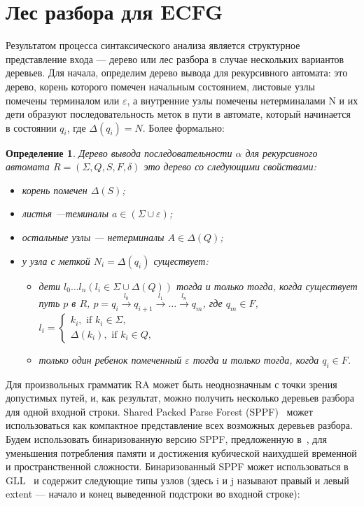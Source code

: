 \documentclass[14pt]{matmex-diploma-custom}
\newtheorem{mydef}{Определение}
\begin{document}
	\section{Лес разбора для ECFG}
	Результатом процесса синтаксического анализа является структурное представление 
	входа --- дерево или лес разбора в случае нескольких вариантов деревьев.
	Для начала, определим дерево вывода для рекурсивного автомата: 
	это дерево, корень которого помечен начальным состоянием, листовые узлы помечены
	терминалом или $\varepsilon$, а внутренние узлы помечены нетерминалами N и их
	дети образуют последовательность меток в пути в автомате, который начинается в 
	состоянии $q_i$, где $ \Delta(q_i) = N $. Более формально:
	
	\begin{mydef}
		
		Дерево вывода последовательности $\alpha$ для рекурсивного автомата $R=(\Sigma, Q, S, F, \delta)$ это дерево со следующими свойствами:
		
		\begin{itemize}
			\item корень помечен $\Delta(S)$;
			\item листья ---теминалы $a\in (\Sigma \cup \varepsilon)$;
			\item остальные узлы --- нетерминалы $A\in \Delta(Q)$;
			\item у узла с меткой $N_i = \Delta(q_i)$ существует:
			\begin{itemize}
				\item 
				дети $l_0 \dots l_n (l_i \in \Sigma \cup \Delta(Q))$ тогда и только тогда,
				когда существует путь $p$ в $R$, $p = q_i \xrightarrow[]{l_0} q_{i+1} \xrightarrow[]{l_1} \dots \xrightarrow{l_n} q_m$, где
				$q_m \in F$, $l_i = 
				\left\{
				\begin{matrix}
				k_i, \text{ if }  k_i \in \Sigma,\\
				\Delta(k_i), \text{ if } k_i \in Q,
				\end{matrix}
				\right.
				$
				\item только один ребенок помеченный $\varepsilon$ тогда и только тогда,
				когда $ q_i \in F $.
			\end{itemize}
		\end{itemize}
	\end{mydef}
	Для произвольных грамматик RA может быть неоднозначным с точки зрения допустимых путей,
	и, как результат, можно получить несколько деревьев разбора для одной входной строки.
	Shared Packed Parse Forest (SPPF)~\cite{SPPF} может использоваться как компактное
	представление всех возможных деревьев разбора. Будем использовать бинаризованную версию SPPF,
	предложенную в~\cite{brnglr}, для уменьшения потребления памяти и достижения кубической
	наихудшей временной и пространственной сложности. Бинаризованный SPPF может использоваться
	в GLL~\cite{scott2013gll} и содержит следующие типы узлов (здесь i и j называют правый и
	левый extent --- начало и конец выведенной подстроки во входной строке):
	
\end{document}
